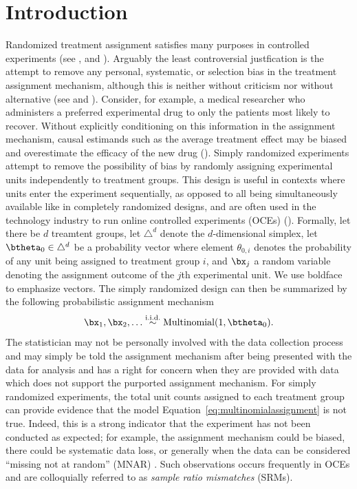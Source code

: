 \documentclass[11pt]{article}
\begin{document}
\section{Introduction}
\label{sec:intro}
Randomized treatment assignment satisfies many purposes in controlled experiments (see \cite{kempthorne}, \cite{cox} and \cite{rubin}).
Arguably the least controversial justfication is the attempt to remove any personal, systematic, or selection bias in the treatment assignment mechanism, although this is neither without criticism nor without alternative (see \cite{lindley} and \cite{kadane}).
Consider, for example, a medical researcher who administers a preferred experimental drug to only the patients most likely to recover.
Without explicitly conditioning on this information in the assignment mechanism, causal estimands such as the average treatment effect may be biased and overestimate the efficacy of the new drug (\cite{berry}).
Simply randomized experiments attempt to remove the possibility of bias by randomly assigning experimental units independently to treatment groups.
This design is useful in contexts where units enter the experiment sequentially, as opposed to all being simultaneously available like in completely randomized designs, and are often used in the technology industry to run online controlled experiments (OCEs) (\cite{oce}).
Formally, let there be $d$ treamtent groups, let $\triangle^d$ denote the $d$-dimensional simplex, let $\btheta_0 \in \triangle^d$ be a probability vector where element $\theta_{0,i}$ denotes the probability of any unit being assigned to treatment group $i$, and $\bx_j$ a random variable denoting the assignment outcome of the $j$th experimental unit.
We use boldface to emphasize vectors.
The simply randomized design can then be summarized by the following probabilistic assignment mechanism
\begin{equation}
  \label{eq:multinomialassignment}
  \bx_1,\bx_2, \dots \stackrel{\text{i.i.d.}}{\sim} \text{Multinomial}(1,\btheta_0).
\end{equation}
The statistician may not be personally involved with the data collection process and may simply be told the assignment mechanism after being presented with the data for analysis and 
has a right for concern when they are provided with data which does not support the purported assignment mechanism.
For simply randomized experiments, the total unit counts assigned to each treatment group can provide evidence that the model Equation~\ref{eq:multinomialassignment} is not true.
Indeed, this is a strong indicator that the experiment has not been conducted as expected; for example, the assignment mechanism could be biased, there could be systematic data loss, or generally when the data can be considered ``missing not at random'' (MNAR) \citep{missing-data}.
Such observations occurs frequently in OCEs and are colloquially referred to  as \textit{sample ratio mismatches} (SRMs).
\end{document}

